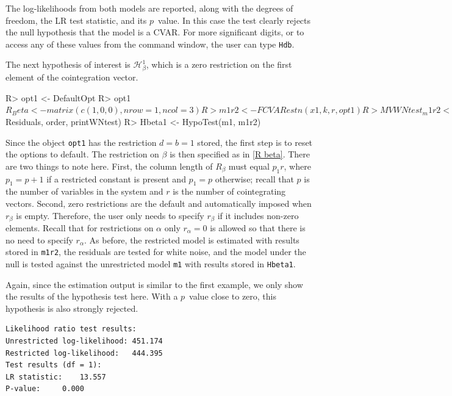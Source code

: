 \documentclass[article]{jss}
\begin{document}
The log-likelihoods from both models are reported, along with the degrees of freedom, the LR test statistic, and its $p$~value. In this case the test clearly rejects the null hypothesis that the model is a CVAR. For more significant digits, or to access any of these values from the command window, the user can type \verb|Hdb|.

The next hypothesis of interest is $\mathscr{H}_{\beta}^1$, which is a zero restriction on the first element of the cointegration vector.

\begin{Code}
R> opt1 <- DefaultOpt
R> opt1$R_Beta <- matrix(c(1, 0, 0), nrow = 1, ncol = 3)
R> m1r2 <- FCVARestn(x1, k, r, opt1)
R> MVWNtest_m1r2 <- MVWNtest(m1r2$Residuals, order, printWNtest)
R> Hbeta1 <- HypoTest(m1, m1r2)
\end{Code}

Since the object \verb|opt1| has the restriction $d=b=1$ stored, the first step is to reset the options to default. The restriction on $\beta$ is then specified as in \eqref{R beta}. There are two things to note here. First, the column length of $R_{\beta}$ must equal $p_1 r$, where $p_1=p+1$ if a restricted constant is present and $p_1=p$ otherwise; recall that $p$ is the number of variables in the system and $r$ is the number of cointegrating vectors. Second, zero restrictions are the default and automatically imposed when $r_{\beta}$ is empty. Therefore, the user only needs to specify $r_{\beta}$ if it includes non-zero elements. Recall that for restrictions on $\alpha$ only $r_\alpha = 0$ is allowed so that there is no need to specify $r_\alpha$. As before, the restricted model is estimated with results stored in \verb|m1r2|, the residuals are tested for white noise, and the model under the null is tested against the unrestricted model \verb|m1| with results stored in \verb|Hbeta1|.

Again, since the estimation output is similar to the first example, we only show the results of the hypothesis test here. With a $p$~value close to zero, this hypothesis is also strongly rejected.

\begin{verbatim}
Likelihood ratio test results:
Unrestricted log-likelihood: 451.174
Restricted log-likelihood:   444.395
Test results (df = 1):
LR statistic: 	 13.557
P-value: 	 0.000
\end{verbatim}
\end{document}
